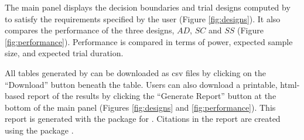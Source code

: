\documentclass[article]{jss}
\begin{document}
The main panel displays the decision boundaries and trial designs  computed by  to satisfy the requirements specified by the user  (Figure \ref{fig:designs}). It also compares the performance of the three designs, $AD$, $SC$ and $SS$ (Figure \ref{fig:performance}). Performance is compared in terms of power, expected sample size, and expected trial duration.

All tables generated by  can be downloaded as csv files by clicking on the ``Download'' button beneath the table. Users can also download a printable, html-based report of the results by clicking the ``Generate Report'' button at the bottom of the main panel (Figures \ref{fig:designs} and \ref{fig:performance}). This report is generated with the  package for  \citep{knitr}. Citations in the report are created using the  package \citep{knitcitations}.
\end{document}
